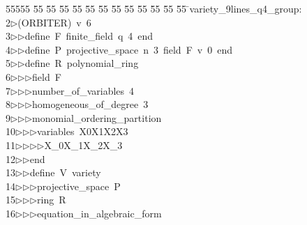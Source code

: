 %
%
\begin{tabbing}
55555 \= 55 \= 55 \= 55 \= 55 \= 55 \= 55 \= 55 \= 55 \= 55 \= 55 \= 55 \= 55 \= \>variety\_9lines\_q4\_group:\\[0pt]
2\>$\triangleright$\>(ORBITER)\ v\ 6\ \\[0pt]
3\>$\triangleright$\>$\triangleright$\>define\ F\ finite\_field\ q\ 4\ end\ \\[0pt]
4\>$\triangleright$\>$\triangleright$\>define\ P\ projective\_space\ n\ 3\ field\ F\ v\ 0\ end\ \\[0pt]
5\>$\triangleright$\>$\triangleright$\>define\ R\ polynomial\_ring\ \\[0pt]
6\>$\triangleright$\>$\triangleright$\>$\triangleright$\>field\ F\ \\[0pt]
7\>$\triangleright$\>$\triangleright$\>$\triangleright$\>number\_of\_variables\ 4\ \\[0pt]
8\>$\triangleright$\>$\triangleright$\>$\triangleright$\>homogeneous\_of\_degree\ 3\ \\[0pt]
9\>$\triangleright$\>$\triangleright$\>$\triangleright$\>monomial\_ordering\_partition\ \\[0pt]
10\>$\triangleright$\>$\triangleright$\>$\triangleright$\>variables\ X0X1X2X3\ \\[0pt]
11\>$\triangleright$\>$\triangleright$\>$\triangleright$\>$\triangleright$\>X\_0X\_1X\_2X\_3\ \\[0pt]
12\>$\triangleright$\>$\triangleright$\>end\ \\[0pt]
13\>$\triangleright$\>$\triangleright$\>define\ V\ variety\ \\[0pt]
14\>$\triangleright$\>$\triangleright$\>$\triangleright$\>projective\_space\ P\ \\[0pt]
15\>$\triangleright$\>$\triangleright$\>$\triangleright$\>ring\ R\ \\[0pt]
16\>$\triangleright$\>$\triangleright$\>$\triangleright$\>equation\_in\_algebraic\_form\ \\[0pt]

\end{tabbing}
